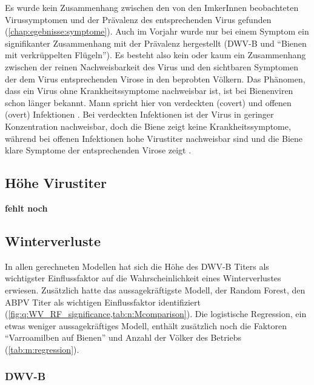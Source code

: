 Es wurde kein Zusammenhang zwischen den von den ImkerInnen beobachteten Virussymptomen und der Prävalenz des entsprechenden Virus gefunden (\cref{chap:egebnisse:symptome}). Auch im Vorjahr wurde nur bei einem Symptom ein signifikanter Zusammenhang mit der Prävalenz hergestellt (DWV-B und \enquote{Bienen mit verkrüppelten Flügeln}). Es besteht also kein oder kaum ein Zusammenhang zwischen der reinen Nachweisbarkeit des Virus und den sichtbaren Symptomen der dem Virus entsprechenden Virose in den beprobten Völkern. Das Phänomen, dass ein Virus ohne Krankheitssymptome nachweisbar ist, ist bei Bienenviren schon länger bekannt. Mann spricht hier von verdeckten (covert) und offenen (overt) Infektionen \citep{yue2007}. Bei verdeckten Infektionen ist der Virus in geringer Konzentration nachweisbar, doch die Biene zeigt keine Krankheitssymptome, während bei offenen Infektionen hohe Virustiter nachweisbar sind und die Biene klare Symptome der entsprechenden Virose zeigt \citep{schurr2019}.


\subsection{Höhe Virustiter}

\textbf{fehlt noch}

\subsection{Winterverluste}

In allen gerechneten Modellen hat sich die Höhe des DWV-B Titers als wichtigster Einflussfaktor auf die Wahrscheinlichkeit eines Winterverlustes erwiesen. Zusätzlich hatte das aussagekräftigste Modell, der Random Forest, den ABPV Titer als wichtigen Einflussfaktor identifiziert (\cref{fig:q:WV_RF_significance,tab:n:Mcomparison}). Die logistische Regression, ein etwas weniger aussagekräftiges Modell, enthält zusätzlich noch die Faktoren \enquote{Varroamilben auf Bienen} und Anzahl der Völker des Betriebs (\cref{tab:m:regression}).

\subsubsection{DWV-B}

